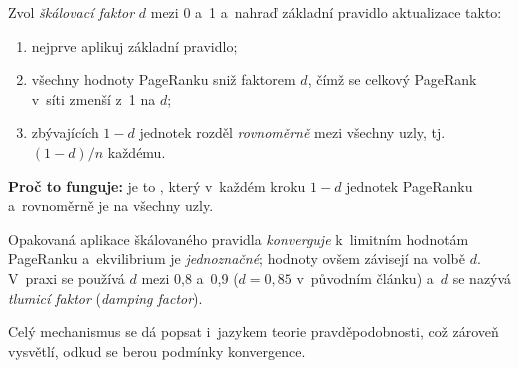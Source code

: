 \documentclass[11pt,a4paper]{article}
\theoremstyle{definition}
\begin{document}
\begin{defbox}
Zvol \emph{škálovací faktor} $d$ mezi 0 a~1 a~nahraď základní pravidlo aktualizace takto:
\begin{enumerate}
\item nejprve aplikuj základní pravidlo;
\item všechny hodnoty PageRanku sniž faktorem $d$, čímž se celkový PageRank v~síti zmenší
      z~1 na $d$;
\item zbývajících $1-d$ jednotek rozděl \emph{rovnoměrně} mezi všechny uzly, tj.\ $(1-d)/n$
      každému.
\end{enumerate}
\textbf{Proč to funguje:} je to , který v~každém kroku $1-d$ jednotek
PageRanku  a~rovnoměrně je  na všechny uzly.

Opakovaná aplikace škálovaného pravidla \emph{konverguje} k~limitním hodnotám PageRanku
a~ekvilibrium je \emph{jednoznačné}; hodnoty ovšem závisejí na volbě $d$. V~praxi se používá
$d$ mezi 0,8 a~0,9 ($d=0{,}85$ v~původním článku) a~$d$ se nazývá \emph{tlumicí faktor}
(\emph{damping factor}).
\end{defbox}

Celý mechanismus se dá popsat i~jazykem teorie pravděpodobnosti, což zároveň vysvětlí, odkud se
berou podmínky konvergence.
\end{document}
